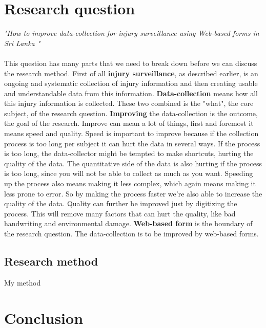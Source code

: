 \documentclass[UKenglish]{ifimaster}
\newcommand{\RQ}{How to improve data-collection for injury surveillance
using Web-based forms in Sri Lanka }
\newcommand{\is}{injury surveillance}
\begin{document}
\chapter{Research question}
\textit{"\RQ"}
\\\\
This question has many parts that we need to break down before we can discuss the research method.
First of all \textbf{\is}, as described earlier, is an ongoing and systematic collection of injury information and then creating usable
and understandable data from this information. \textbf{Data-collection} means how all this injury information is collected. These two combined is the "what", the core subject, of the research question.
\textbf{Improving} the data-collection is the outcome, the goal of the research. Improve can mean a lot of things, first and foremost it means speed and quality. 
Speed is important to improve because if the collection process is too long per subject it can hurt the data in several ways. If the process is too long, the data-collector might be tempted to make shortcuts, hurting the quality of the data.
The quantitative side of the data is also hurting if the process is too long, since you will not be able to collect as much as you want.
Speeding up the process also means making it less complex, which again means making it less prone to error. So by making the process faster we're also able to increase the quality of the data.
Quality can further be improved just by digitizing the process. This will remove many factors that can hurt the quality, like bad handwriting and environmental damage.
\textbf{Web-based form} is the boundary of the research question. The data-collection is to be improved by web-based forms.

\section*{Research method}
My method

\chapter{Conclusion}

\backmatter{}
\printbibliography
\end{document}

